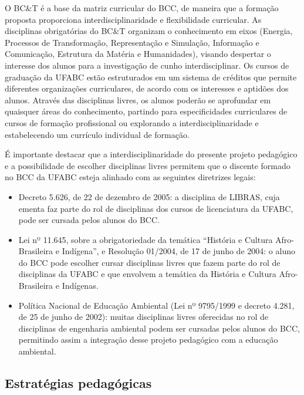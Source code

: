 O BC\&T é a base da matriz curricular do BCC, de maneira que a formação
proposta proporciona interdisciplinaridade e flexibilidade curricular.
As disciplinas obrigatórias do BC\&T organizam o conhecimento em eixos
(Energia, Processos de Transformação, Representação e Simulação, Informação e
Comunicação, Estrutura da Matéria e Humanidades), visando despertar o interesse
dos alunos para a investigação de cunho interdisciplinar.
Os cursos de graduação da UFABC estão estruturados em um sistema de créditos
que permite diferentes organizações curriculares, de acordo com os interesses e
aptidões dos alunos.
Através das disciplinas livres, os alunos poderão se aprofundar em quaisquer
áreas do conhecimento, partindo para especificidades curriculares de cursos de
formação profissional ou explorando a interdisciplinaridade e estabelecendo um
currículo individual de formação.

É importante destacar que a interdisciplinaridade do presente projeto
pedagógico e a possibilidade de escolher disciplinas livres permitem que o
discente formado no BCC da UFABC esteja alinhado com as seguintes diretrizes
legais:
\begin{itemize}
    \item Decreto 5.626, de 22 de dezembro de 2005: a disciplina de LIBRAS,
    cuja ementa faz parte do rol de disciplinas dos cursos de licenciatura da
    UFABC, pode ser cursada pelos alunos do BCC.
    
    \item Lei nº 11.645, sobre a obrigatoriedade da temática ``História e
    Cultura Afro-Brasileira e Indígena'', e Resolução 01/2004, de 17 de junho
    de 2004: o aluno do BCC pode escolher cursar disciplinas livres que fazem
    parte do rol de disciplinas da UFABC e que envolvem a temática da História
    e Cultura Afro-Brasileira e Indígenas.
    
    \item Política Nacional de Educação Ambiental (Lei nº 9795/1999 e decreto
    4.281, de 25 de junho de 2002): muitas disciplinas livres oferecidas no rol
    de disciplinas de engenharia ambiental podem ser cursadas pelos alunos do
    BCC, permitindo assim a integração desse projeto pedagógico com a educação
    ambiental.
\end{itemize}



\subsection{Estratégias pedagógicas}

